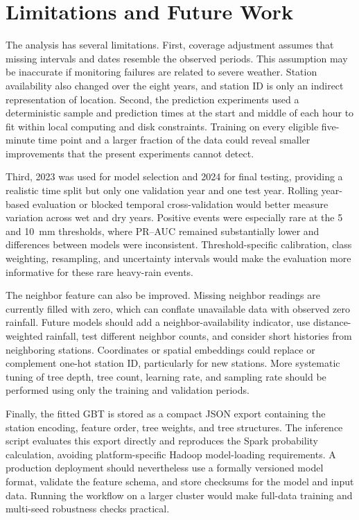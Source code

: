 \documentclass[11pt]{article}
\begin{document}
\section{Limitations and Future Work}

The analysis has several limitations. First, coverage adjustment assumes that
missing intervals and dates resemble the observed periods. This assumption may
be inaccurate if monitoring failures are related to severe weather. Station
availability also changed over the eight years, and station ID is only an
indirect representation of location. Second, the prediction experiments used
a deterministic sample and prediction times at the start and middle of each
hour to fit within local computing and disk constraints. Training on every
eligible five-minute time point and a larger fraction of the data could reveal
smaller improvements that the present experiments cannot detect.

Third, 2023 was used for model selection and 2024 for final testing, providing
a realistic time split but only one validation year and one test year. Rolling
year-based evaluation or blocked temporal cross-validation would better measure
variation across wet and dry years. Positive events were especially rare at
the 5 and 10~mm thresholds, where PR--AUC remained substantially lower and
differences between models were inconsistent. Threshold-specific calibration,
class weighting, resampling, and uncertainty intervals would make the
evaluation more informative for these rare heavy-rain events.

The neighbor feature can also be improved. Missing neighbor readings are
currently filled with zero, which can conflate unavailable data with observed
zero rainfall. Future models should add a neighbor-availability indicator,
use distance-weighted rainfall, test different neighbor counts, and consider
short histories from neighboring stations. Coordinates or spatial embeddings
could replace or complement one-hot station ID, particularly for new stations.
More systematic tuning of tree depth, tree count, learning rate, and sampling
rate should be performed using only the training and validation periods.

Finally, the fitted GBT is stored as a compact JSON export containing the
station encoding, feature order, tree weights, and tree structures. The
inference script evaluates this export directly and reproduces the Spark
probability calculation, avoiding platform-specific Hadoop model-loading
requirements. A production deployment should nevertheless use a formally
versioned model format, validate the feature schema, and store checksums for
the model and input data. Running the workflow on a larger cluster would make
full-data training and multi-seed robustness checks practical.
\end{document}
